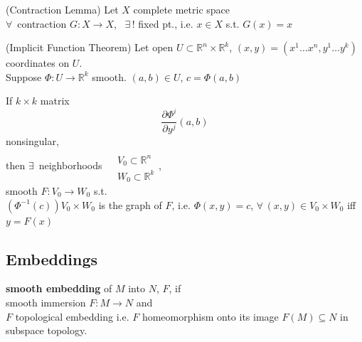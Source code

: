 \begin{lemma}[7.7] (Contraction Lemma)
Let $X$ complete metric space \\
$\forall \,$ contraction $G: X \to X$, \, $\exists \, !$ fixed pt., i.e. $x\in X$ s.t. $G(x) = x$
\end{lemma}

\begin{theorem}[7.9] (Implicit Function Theorem)
  Let open $U \subset \mathbb{R}^n \times \mathbb{R}^k$, $(x,y) = (x^1 \dots x^n, y^1 \dots y^k)$ coordinates on $U$.  \\

Suppose $\Phi : U \to \mathbb{R}^k$ smooth.  $(a,b) \in U$, $c = \Phi(a,b)$

If $k\times k$ matrix 
\[
\frac{ \partial \Phi^i }{ \partial y^j }(a,b)
\]
nonsingular, \\
then $\exists \, $ neighborhoods $\begin{aligned} & \quad \\ 
  & V_0 \subset \mathbb{R}^n \\ 
  & W_0 \subset \mathbb{R}^k \end{aligned}$,  \\
smooth $F: V_0 \to W_0$ s.t. \\
$(\Phi^{-1}(c) ) V_0 \times W_0$ is the graph of $F$, i.e. $\Phi(x,y) = c$, $\forall \, (x,y) \in V_0 \times W_0$ iff $y= F(x)$


\end{theorem}



\subsection*{Embeddings}

\begin{definition}
\textbf{smooth embedding} of $M$ into $N$, $F$, if \\
\phantom{ \quad \, } smooth immersion $F: M\to N$ and \\
\phantom{ \quad \quad \, } $F$ topological embedding i.e. $F$ homeomorphism onto its image $F(M) \subseteq N$ in subspace topology.  

\end{definition}


